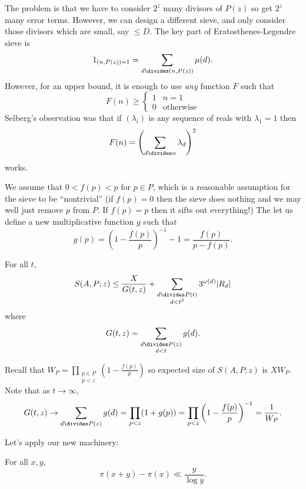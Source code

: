\documentclass[a4paper]{article}
\begin{document}
The problem is that we have to consider \(2^z\) many divisors of \(P(z)\) so get \(2^z\) many error terms. However, we can design a different sieve, and only consider those divisors which are small, say \(\leq D\). The key part of Eratosthenes-Legendre sieve is
\[
  1_{(n, P(z)) = 1} = \sum_{d \divides (n, P(z))} \mu(d).
\]
However, for an upper bound, it is enough to use \emph{any} function \(F\) such that
\[
  F(n) \geq
  \begin{cases}
    1 & n = 1 \\
    0 & \text{otherwise}
  \end{cases}
\]
Selberg's observation was that if \((\lambda_i)\) is any sequence of reals with \(\lambda_1 = 1\) then
\[
  F(n) = \left( \sum_{d \divides n} \lambda_d \right)^2
\]
works.

We assume that \(0 < f(p) < p\) for \(p \in P\), which is a reasonable assumption for the sieve to be ``nontrivial'' (if \(f(p) = 0\) then the sieve does nothing and we may well just remove \(p\) from \(P\). If \(f(p) = p\) then it sifts out everything!) The let us define a new multiplicative function \(g\) such that
\[
  g(p) = \left( 1 - \frac{f(p)}{p} \right)^{-1} - 1 = \frac{f(p)}{p - f(p)}.
\]

\begin{theorem}
  \label{thm:Selberg's sieve}
  For all \(t\),
  \[
    S(A, P; z) \leq \frac{X}{G(t, z)} + \sum_{\substack{d \divides P(t) \\ d < t^2}} 3^{\omega(d)} |R_d|
  \]
  where
  \[
    G(t, z) = \sum_{\substack{d \divides P(z) \\ d < t}} g(d).
  \]
\end{theorem}

Recall that \(W_P = \prod_{\substack{p \in P \\ p < z}} (1 - \frac{f(p)}{p})\) so expected size of \(S(A, P; z)\) is \(XW_P\). Note that as \(t \to \infty\),
\[
  G(t, z)
  \to \sum_{d \divides P(z)} g(d) 
  = \prod_{p < z} (1 + g(p))
  = \prod_{p < z} \left( 1 - \frac{f(p)}{p} \right)^{-1}
  = \frac{1}{W_P}.
\]

Let's apply our new machinery:
\begin{corollary}
  For all \(x, y\),
  \[
    \pi(x + y) - \pi(x) \ll \frac{y}{\log y}.
  \]
\end{corollary}
\end{document}
